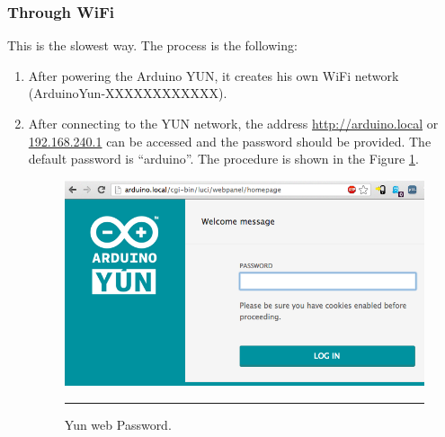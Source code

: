 \documentclass[12pt, a4paper,twoside]{tesi_upf}
\begin{document}
    \subsubsection{Through WiFi}
      This is the slowest way. The process is the following:
      \begin{enumerate}
        \item After powering the Arduino YUN, it creates his own WiFi network (ArduinoYun-XXXXXXXXXXXX).
        \item After connecting to the YUN network, the address \url{http://arduino.local} or \url{192.168.240.1} can be accessed and the password should be provided. The default password is ``arduino''. The procedure is shown in the Figure \ref{fig:YunWebPassword}.
          \begin{figure}[htbp]
            \centering
                \includegraphics[scale=0.3]{./Figures/YunWebPassword.png}
                \rule{18em}{0.5pt}
            \caption[Yun web Password]{Yun web Password.}
            \label{fig:YunWebPassword}
          \end{figure}
        

\end{enumerate}
\end{document}
